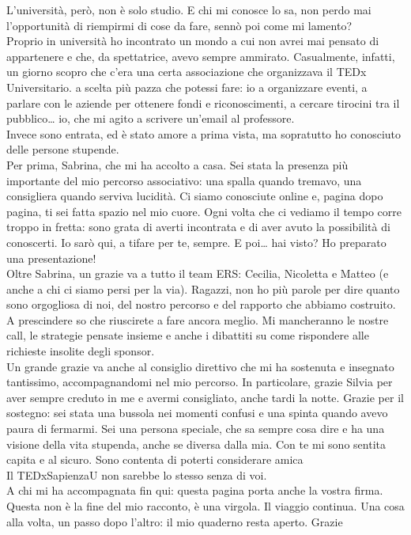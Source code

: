 \begin{acknowledgments}
L'università, però, non è solo studio. E chi mi conosce lo sa, non perdo mai l'opportunità di riempirmi di cose da fare, sennò poi come mi lamento? \\
Proprio in università ho incontrato un mondo a cui non avrei mai pensato di appartenere e che, da spettatrice, avevo sempre ammirato. Casualmente, infatti, un giorno scopro che c'era una certa associazione che organizzava il TEDx Universitario. a scelta più pazza che potessi fare: io a organizzare eventi, a parlare con le aziende per ottenere fondi e riconoscimenti, a cercare tirocini tra il pubblico… io, che mi agito a scrivere un’email al professore.\\
Invece sono entrata, ed è stato amore a prima vista, ma sopratutto ho conosciuto delle persone stupende. \\
Per prima, Sabrina, che mi ha accolto a casa. Sei stata la presenza più importante del mio percorso associativo: una spalla quando tremavo, una consigliera quando serviva lucidità. Ci siamo conosciute online e, pagina dopo pagina, ti sei fatta spazio nel mio cuore. Ogni volta che ci vediamo il tempo corre troppo in fretta: sono grata di averti incontrata e di aver avuto la possibilità di conoscerti. Io sarò qui, a tifare per te, sempre. E poi… hai visto? Ho preparato una presentazione! \\
Oltre Sabrina, un grazie va a tutto il team ERS: Cecilia, Nicoletta e Matteo (e anche a chi ci siamo persi per la via). Ragazzi, non ho più parole per dire quanto sono orgogliosa di noi, del nostro percorso e del rapporto che abbiamo costruito. A prescindere so che riuscirete a fare ancora meglio. Mi mancheranno le nostre call, le strategie pensate insieme e anche i dibattiti su come rispondere alle richieste insolite degli sponsor.\\
Un grande grazie va anche al consiglio direttivo che mi ha sostenuta e insegnato tantissimo, accompagnandomi nel mio percorso. In particolare, grazie Silvia per aver sempre creduto in me e avermi consigliato, anche tardi la notte. Grazie per il sostegno: sei stata una bussola nei momenti confusi e una spinta quando avevo paura di fermarmi. Sei una persona speciale, che sa sempre cosa dire e ha una visione della vita stupenda, anche se diversa dalla mia. Con te mi sono sentita capita e al sicuro. Sono contenta di poterti considerare amica \\
Il TEDxSapienzaU non sarebbe lo stesso senza di voi. \\

A chi mi ha accompagnata fin qui: questa pagina porta anche la vostra firma.\\
Questa non è la fine del mio racconto, è una virgola. Il viaggio continua. Una cosa alla volta, un passo dopo l’altro: il mio quaderno resta aperto. Grazie
\end{acknowledgments}